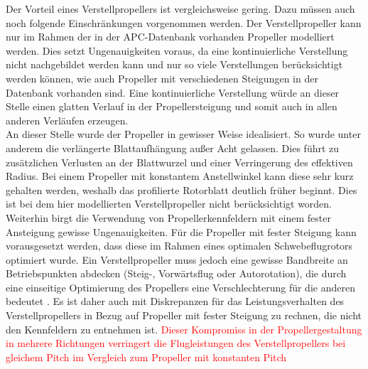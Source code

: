 Der Vorteil eines Verstellpropellers ist vergleichsweise gering. Dazu müssen auch noch folgende Einschränkungen vorgenommen werden. Der Verstellpropeller kann nur im Rahmen der in der APC-Datenbank vorhanden Propeller modelliert werden. Dies setzt Ungenauigkeiten voraus, da eine kontinuierliche Verstellung nicht nachgebildet werden kann und nur so viele Verstellungen berücksichtigt werden können, wie auch Propeller mit verschiedenen Steigungen in der Datenbank vorhanden sind. Eine kontinuierliche Verstellung würde an dieser Stelle einen glatten Verlauf in der Propellersteigung und somit auch in allen anderen Verläufen erzeugen. \\
An dieser Stelle wurde der Propeller in gewisser Weise idealisiert. So wurde unter anderem die verlängerte Blattaufhängung außer Acht gelassen. Dies führt zu zusätzlichen Verlusten an der Blattwurzel und einer Verringerung des effektiven Radius. Bei einem Propeller mit konstantem Anstellwinkel kann diese sehr kurz gehalten werden, weshalb das profilierte Rotorblatt deutlich früher beginnt. Dies ist bei dem hier modellierten Verstellpropeller nicht berücksichtigt worden. Weiterhin birgt die Verwendung von Propellerkennfeldern mit einem fester Ansteigung gewisse Ungenauigkeiten. Für die Propeller mit fester Steigung kann vorausgesetzt werden, dass diese im Rahmen eines optimalen Schwebeflugrotors \cite[S.197-S.205]{Wall.2015} optimiert wurde. Ein Verstellpropeller muss jedoch eine gewisse Bandbreite an Betriebspunkten abdecken (Steig-, Vorwärtsflug oder Autorotation), die durch eine einseitige Optimierung des Propellers eine Verschlechterung für die anderen bedeutet \cite[S.203]{Wall.2015}. Es ist daher auch mit Diskrepanzen für das Leistungsverhalten des Verstellpropellers in Bezug auf Propeller mit fester Steigung zu rechnen, die nicht den Kennfeldern zu entnehmen ist. \textcolor{red}{Dieser Kompromiss in der Propellergestaltung in mehrere Richtungen verringert die Flugleistungen des Verstellpropellers bei gleichem Pitch im Vergleich zum Propeller mit konstanten Pitch}\\
